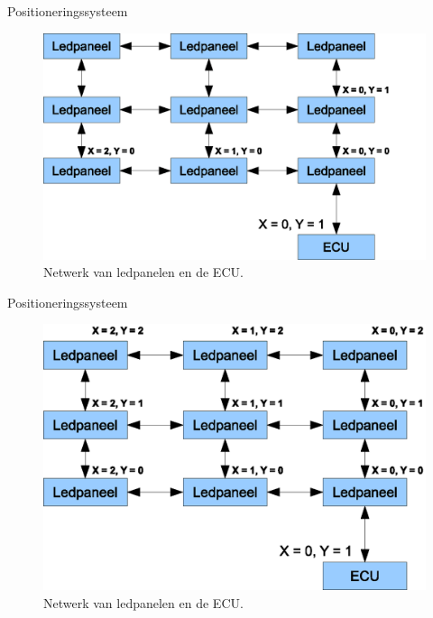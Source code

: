\begin{frame}{Positioneringssysteem}
	\begin{figure}[h]
		\centering
		\includegraphics[width=12cm]{animatie/5}
		\caption{Netwerk van ledpanelen en de ECU.}
	\end{figure}
\end{frame}

\begin{frame}{Positioneringssysteem}
	\begin{figure}[h]
		\centering
		\includegraphics[width=12cm]{animatie/6}
		\caption{Netwerk van ledpanelen en de ECU.}
	\end{figure}
\end{frame}

